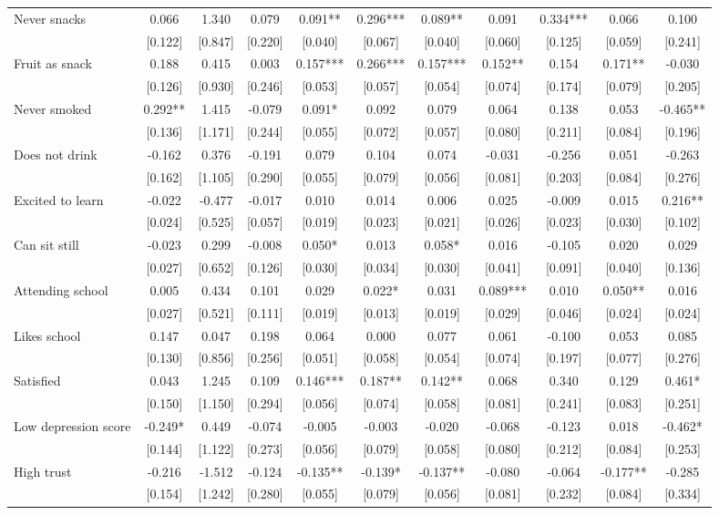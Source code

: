 \documentclass[12pt]{article}
\begin{document}
\begin{table}[ht]
\begin{center}
\begin{adjustbox}{width=1.2\textwidth,center=\textwidth}
\begin{tabular}{l*{10}{c}}
Never snacks & 0.066 & 1.340 & 0.079 & 0.091** & 0.296*** & 0.089** & 0.091 & 0.334*** & 0.066 & 0.100 \\
 & [0.122] & [0.847] & [0.220] & [0.040] & [0.067] & [0.040] & [0.060] & [0.125] & [0.059] & [0.241] \\
Fruit as snack & 0.188 & 0.415 & 0.003 & 0.157*** & 0.266*** & 0.157*** & 0.152** & 0.154 & 0.171** & -0.030 \\
 & [0.126] & [0.930] & [0.246] & [0.053] & [0.057] & [0.054] & [0.074] & [0.174] & [0.079] & [0.205] \\
Never smoked & 0.292** & 1.415 & -0.079 & 0.091* & 0.092 & 0.079 & 0.064 & 0.138 & 0.053 & -0.465** \\
 & [0.136] & [1.171] & [0.244] & [0.055] & [0.072] & [0.057] & [0.080] & [0.211] & [0.084] & [0.196] \\
Does not drink & -0.162 & 0.376 & -0.191 & 0.079 & 0.104 & 0.074 & -0.031 & -0.256 & 0.051 & -0.263 \\
 & [0.162] & [1.105] & [0.290] & [0.055] & [0.079] & [0.056] & [0.081] & [0.203] & [0.084] & [0.276] \\
Excited to learn & -0.022 & -0.477 & -0.017 & 0.010 & 0.014 & 0.006 & 0.025 & -0.009 & 0.015 & 0.216** \\
 & [0.024] & [0.525] & [0.057] & [0.019] & [0.023] & [0.021] & [0.026] & [0.023] & [0.030] & [0.102] \\
Can sit still & -0.023 & 0.299 & -0.008 & 0.050* & 0.013 & 0.058* & 0.016 & -0.105 & 0.020 & 0.029 \\
 & [0.027] & [0.652] & [0.126] & [0.030] & [0.034] & [0.030] & [0.041] & [0.091] & [0.040] & [0.136] \\
Attending school & 0.005 & 0.434 & 0.101 & 0.029 & 0.022* & 0.031 & 0.089*** & 0.010 & 0.050** & 0.016 \\
 & [0.027] & [0.521] & [0.111] & [0.019] & [0.013] & [0.019] & [0.029] & [0.046] & [0.024] & [0.024] \\
Likes school & 0.147 & 0.047 & 0.198 & 0.064 & 0.000 & 0.077 & 0.061 & -0.100 & 0.053 & 0.085 \\
 & [0.130] & [0.856] & [0.256] & [0.051] & [0.058] & [0.054] & [0.074] & [0.197] & [0.077] & [0.276] \\
Satisfied & 0.043 & 1.245 & 0.109 & 0.146*** & 0.187** & 0.142** & 0.068 & 0.340 & 0.129 & 0.461* \\
 & [0.150] & [1.150] & [0.294] & [0.056] & [0.074] & [0.058] & [0.081] & [0.241] & [0.083] & [0.251] \\
Low depression score & -0.249* & 0.449 & -0.074 & -0.005 & -0.003 & -0.020 & -0.068 & -0.123 & 0.018 & -0.462* \\
 & [0.144] & [1.122] & [0.273] & [0.056] & [0.079] & [0.058] & [0.080] & [0.212] & [0.084] & [0.253] \\
High trust & -0.216 & -1.512 & -0.124 & -0.135** & -0.139* & -0.137** & -0.080 & -0.064 & -0.177** & -0.285 \\
 & [0.154] & [1.242] & [0.280] & [0.055] & [0.079] & [0.056] & [0.081] & [0.232] & [0.084] & [0.334] \\


\end{tabular}
\end{adjustbox}
\end{center}
\end{table}
\end{document}
